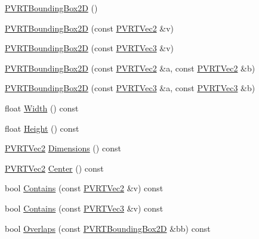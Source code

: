 \begin{DoxyCompactItemize}
\item 
\hyperlink{structpvrnavigation_1_1_p_v_r_t_bounding_box2_d_a6c56a4d0cae7d4d69a464c50085ea9da}{P\+V\+R\+T\+Bounding\+Box2\+D} ()
\item 
\hyperlink{structpvrnavigation_1_1_p_v_r_t_bounding_box2_d_af84ff043b6b1b74ba15b5901ece8d72b}{P\+V\+R\+T\+Bounding\+Box2\+D} (const \hyperlink{struct_p_v_r_t_vec2}{P\+V\+R\+T\+Vec2} \&v)
\item 
\hyperlink{structpvrnavigation_1_1_p_v_r_t_bounding_box2_d_a45cb3ca5b265ca03d134739a50597e9f}{P\+V\+R\+T\+Bounding\+Box2\+D} (const \hyperlink{struct_p_v_r_t_vec3}{P\+V\+R\+T\+Vec3} \&v)
\item 
\hyperlink{structpvrnavigation_1_1_p_v_r_t_bounding_box2_d_a1b62d750c8cd39cc0d7a28faaddb4249}{P\+V\+R\+T\+Bounding\+Box2\+D} (const \hyperlink{struct_p_v_r_t_vec2}{P\+V\+R\+T\+Vec2} \&a, const \hyperlink{struct_p_v_r_t_vec2}{P\+V\+R\+T\+Vec2} \&b)
\item 
\hyperlink{structpvrnavigation_1_1_p_v_r_t_bounding_box2_d_a1c6e71cbbfacd4f753defdd0d5e4ae30}{P\+V\+R\+T\+Bounding\+Box2\+D} (const \hyperlink{struct_p_v_r_t_vec3}{P\+V\+R\+T\+Vec3} \&a, const \hyperlink{struct_p_v_r_t_vec3}{P\+V\+R\+T\+Vec3} \&b)
\item 
float \hyperlink{structpvrnavigation_1_1_p_v_r_t_bounding_box2_d_af1c371e4ce121c1710364edcecdaf232}{Width} () const 
\item 
float \hyperlink{structpvrnavigation_1_1_p_v_r_t_bounding_box2_d_aa9a340816b7414cfda9ff39b6ef2d712}{Height} () const 
\item 
\hyperlink{struct_p_v_r_t_vec2}{P\+V\+R\+T\+Vec2} \hyperlink{structpvrnavigation_1_1_p_v_r_t_bounding_box2_d_a106a2393ad829e6f95d1686a7a925106}{Dimensions} () const 
\item 
\hyperlink{struct_p_v_r_t_vec2}{P\+V\+R\+T\+Vec2} \hyperlink{structpvrnavigation_1_1_p_v_r_t_bounding_box2_d_a41241f3628e6cf6f623793045fabbcd3}{Center} () const 
\item 
bool \hyperlink{structpvrnavigation_1_1_p_v_r_t_bounding_box2_d_a0f28f5dec956bcceb470ea6f6081d124}{Contains} (const \hyperlink{struct_p_v_r_t_vec2}{P\+V\+R\+T\+Vec2} \&v) const 
\item 
bool \hyperlink{structpvrnavigation_1_1_p_v_r_t_bounding_box2_d_a65789027440c02c0e2b7dce8102979b5}{Contains} (const \hyperlink{struct_p_v_r_t_vec3}{P\+V\+R\+T\+Vec3} \&v) const 
\item 
bool \hyperlink{structpvrnavigation_1_1_p_v_r_t_bounding_box2_d_a6a505b9bc7cf75d143c89d4d3b270879}{Overlaps} (const \hyperlink{structpvrnavigation_1_1_p_v_r_t_bounding_box2_d}{P\+V\+R\+T\+Bounding\+Box2\+D} \&bb) const 

\end{DoxyCompactItemize}
